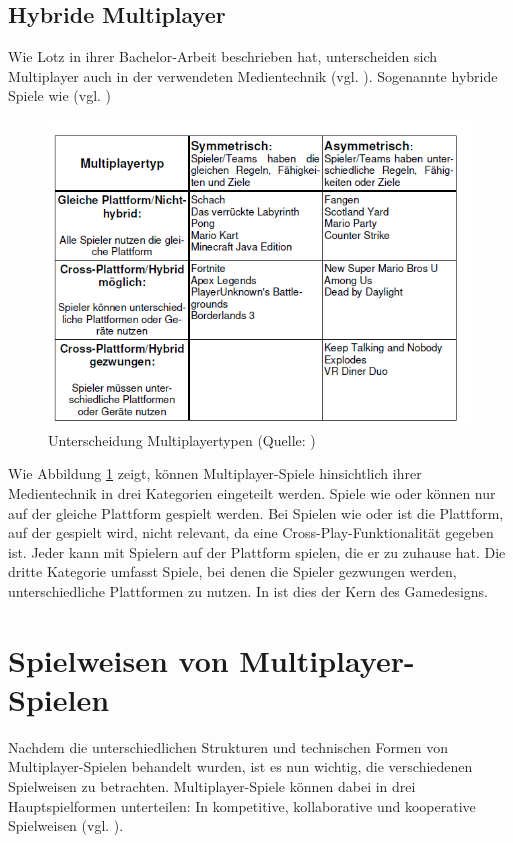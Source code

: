 \subsection{Hybride Multiplayer}
Wie Lotz in ihrer Bachelor-Arbeit beschrieben hat, unterscheiden sich Multiplayer auch in der verwendeten Medientechnik (vgl. \cite[S. 6f]{lotz_konzeption_2021}). Sogenannte hybride Spiele wie  (vgl. \cite{noauthor_mario_nodate-1})

\begin{figure}[ht]
\centering
\includegraphics[width=1\linewidth]{content/pictures/lotz_hybrid_multiplayer.PNG}
\caption{Unterscheidung Multiplayertypen (Quelle: \cite[S.6]{lotz_konzeption_2021})}
\label{fig:lotz_multiplayer_types}
\end{figure}

Wie Abbildung \ref{fig:lotz_multiplayer_types} zeigt, können Multiplayer-Spiele hinsichtlich ihrer Medientechnik in drei Kategorien eingeteilt werden.
Spiele wie  oder  können nur auf der gleiche Plattform gespielt werden. Bei Spielen wie  oder  ist die Plattform, auf der gespielt wird, nicht relevant, da eine Cross-Play-Funktionalität gegeben ist. Jeder kann mit Spielern auf der Plattform spielen, die er zu zuhause hat. Die dritte Kategorie umfasst Spiele, bei denen die Spieler gezwungen werden, unterschiedliche Plattformen zu nutzen. In  ist dies der Kern des Gamedesigns.

\section{Spielweisen von Multiplayer-Spielen}
Nachdem die unterschiedlichen Strukturen und technischen Formen von Multiplayer-Spielen behandelt wurden, ist es nun wichtig, die verschiedenen Spielweisen zu betrachten. Multiplayer-Spiele können dabei in drei Hauptspielformen unterteilen:
In kompetitive, kollaborative und kooperative Spielweisen (vgl. \cite[S. 25f]{zagal_collaborative_2006}).

